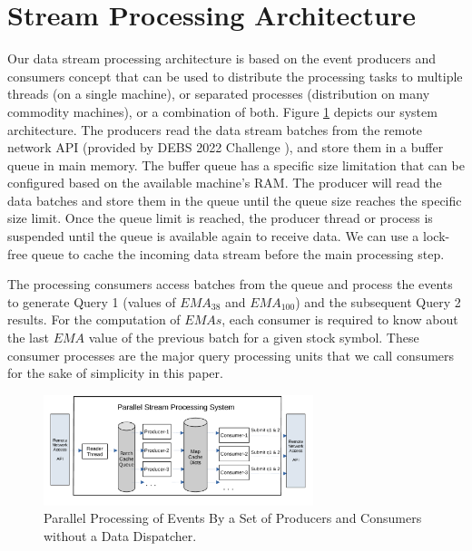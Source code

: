 \section{Stream Processing Architecture}\label{sec:concepts}
Our data stream processing architecture is based on the event producers and consumers concept that can be used to distribute the
processing tasks to multiple threads (on a single machine), or separated processes
(distribution on many commodity machines), or a combination of both.
Figure \ref{fig:parallel-srream-processing1} depicts our system architecture. The producers read the data stream batches from the
remote network API (provided by DEBS 2022 Challenge \cite{debs2022challenge}), and store them in a buffer queue in main memory.
The buffer queue has a specific size limitation that can be configured based on the available machine's RAM. The producer will read the data batches
and store them in the queue until the queue size reaches the specific size limit. Once the queue limit is reached, the producer thread or process
is suspended until the queue is available again to receive data. We can use a lock-free queue to cache the incoming data stream before the main processing step.

The processing consumers access batches from the queue and process the events to generate Query 1 (values of $EMA_{38}$ and $EMA_{100}$)
and the subsequent Query 2 results. For the computation of $EMAs$, each consumer is required to know about the
last $EMA$ value of the previous batch for a given stock symbol.
These consumer processes are the major query processing units that we call consumers for the sake of simplicity in this paper.

\begin{figure}[!ht]
    \begin{center}
        \includegraphics[width=0.7\textwidth]{./images/Parallel-Stream-Processing-System_v2}
        \caption{Parallel Processing of Events By a Set of Producers and Consumers without a Data Dispatcher.}
        \label{fig:parallel-srream-processing1}
    \end{center}
\end{figure}

